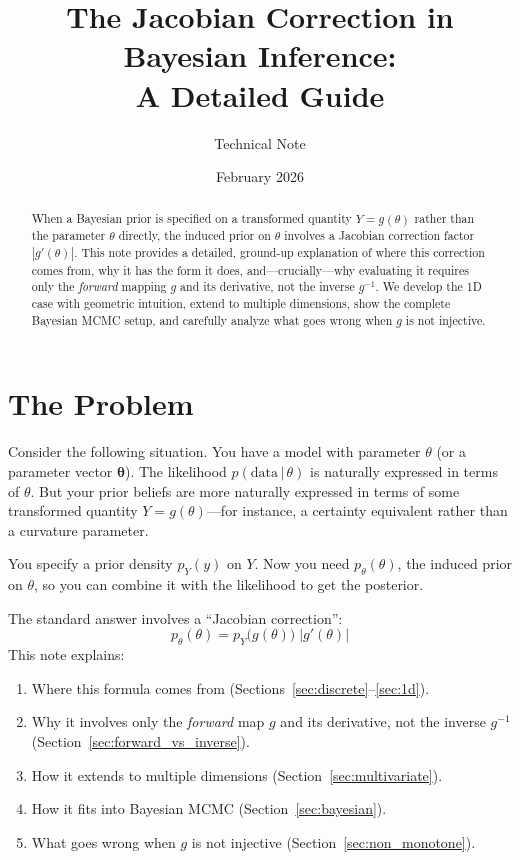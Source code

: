 \documentclass[11pt,a4paper]{article}
\title{The Jacobian Correction in Bayesian Inference:\\
A Detailed Guide}
\author{Technical Note}
\date{February 2026}
\theoremstyle{definition}
\newcommand{\given}{\,|\,}
\newcommand{\btheta}{\boldsymbol{\theta}}
\begin{document}
\maketitle

\begin{abstract}
When a Bayesian prior is specified on a transformed quantity $Y = g(\theta)$
rather than the parameter $\theta$ directly, the induced prior on $\theta$
involves a Jacobian correction factor $|g'(\theta)|$. This note provides a
detailed, ground-up explanation of where this correction comes from, why it
has the form it does, and---crucially---why evaluating it requires only the
\emph{forward} mapping $g$ and its derivative, not the inverse $g^{-1}$. We
develop the 1D case with geometric intuition, extend to multiple dimensions,
show the complete Bayesian MCMC setup, and carefully analyze what goes wrong
when $g$ is not injective.
\end{abstract}

\tableofcontents
\newpage


\section{The Problem}
\label{sec:problem}

Consider the following situation. You have a model with parameter $\theta$
(or a parameter vector $\btheta$). The likelihood $p(\text{data} \given \theta)$
is naturally expressed in terms of $\theta$. But your prior beliefs are more
naturally expressed in terms of some transformed quantity $Y = g(\theta)$---for
instance, a certainty equivalent rather than a curvature parameter.

You specify a prior density $p_Y(y)$ on $Y$. Now you need $p_\theta(\theta)$,
the induced prior on $\theta$, so you can combine it with the likelihood to get
the posterior.

The standard answer involves a ``Jacobian correction'':
\begin{equation}
    \label{eq:main_formula}
    p_\theta(\theta) = p_Y\!\big(g(\theta)\big) \; \big|g'(\theta)\big|
\end{equation}
This note explains:
\begin{enumerate}
    \item Where this formula comes from (Sections~\ref{sec:discrete}--\ref{sec:1d}).
    \item Why it involves only the \emph{forward} map $g$ and its derivative, not
    the inverse $g^{-1}$ (Section~\ref{sec:forward_vs_inverse}).
    \item How it extends to multiple dimensions (Section~\ref{sec:multivariate}).
    \item How it fits into Bayesian MCMC (Section~\ref{sec:bayesian}).
    \item What goes wrong when $g$ is not injective
    (Section~\ref{sec:non_monotone}).
\end{enumerate}
\end{document}
